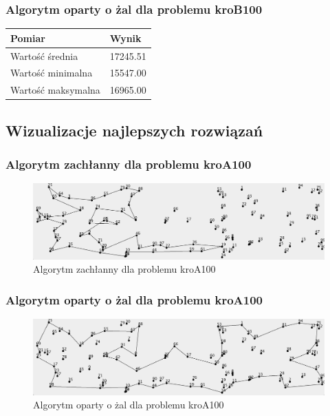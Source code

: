 \documentclass[a4paper]{article}
\begin{document}
\subsubsection{Algorytm oparty o żal dla problemu kroB100}

\begin{center}
	\begin{tabular}{ l | l }
		\textbf{Pomiar} & \textbf{Wynik} \\
		\hline
		Wartość średnia    & 17245.51 \\
		Wartość minimalna  & 15547.00 \\
		Wartość maksymalna & 16965.00 \\
	\end{tabular}
\end{center}

\subsection{Wizualizacje najlepszych rozwiązań}

\subsubsection{Algorytm zachłanny dla problemu kroA100}

\begin{figure}[H]
\centering
\includegraphics[width=\textwidth]{lab1/kroA_greedy}
\caption{Algorytm zachłanny dla problemu kroA100}
\end{figure}

\subsubsection{Algorytm oparty o żal dla problemu kroA100}

\begin{figure}[H]
\centering
\includegraphics[width=\textwidth]{lab1/kroA_regret}
\caption{Algorytm oparty o żal dla problemu kroA100}
\end{figure}
\end{document}
